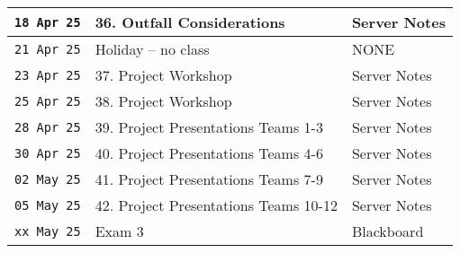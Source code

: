 \documentclass[12pt]{article}
\begin{document}
\begin{center}
\begin{table}[ht!]
\begin{tabular}{| p{0.8in} | p{3.5in} | p{2.0in} |}
\texttt{18 Apr 25} & 36. Outfall Considerations  & Server Notes \\
\hline
\texttt{21 Apr 25} & Holiday -- no class & NONE \\
\texttt{23 Apr 25} & 37. Project Workshop & Server Notes \\
\texttt{25 Apr 25} & 38. Project Workshop & Server Notes  \\
\hline
\texttt{28 Apr 25} & 39. Project Presentations Teams 1-3 & Server Notes   \\
\texttt{30 Apr 25} & 40. Project Presentations Teams 4-6 & Server Notes   \\
\texttt{02 May 25} & 41. Project Presentations Teams 7-9 & Server Notes   \\
\hline
\texttt{05 May 25} & 42. Project Presentations Teams 10-12 & Server Notes   \\
\hline
\hline
\texttt{xx May 25} & Exam 3 & Blackboard \\
\hline
\hline
   \end{tabular}
   \label{tab:sp2025scheduleB}
\end{table}
\end{center}
\clearpage
\end{document}

